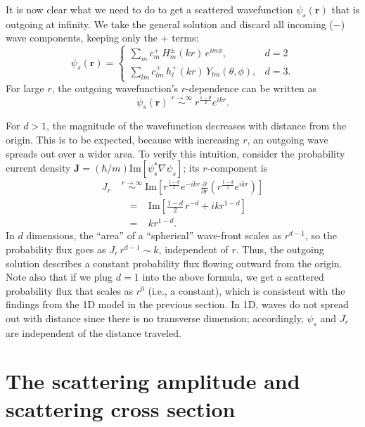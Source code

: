 \documentclass[pra,12pt]{revtex4}
\begin{document}
It is now clear what we need to do to get a scattered wavefunction
$\psi_s(\mathbf{r})$ that is outgoing at infinity.  We take the
general solution and discard all incoming ($-$) wave components,
keeping only the $+$ terms:
$$\psi_s(\mathbf{r}) = \begin{cases} \displaystyle\sum_{m} c_m^+\,H_m^\pm(kr)\,e^{im\phi}, &d=2\\ \displaystyle\sum_{lm} c_{lm}^+\,h_l^+(kr)\,Y_{lm}(\theta,\phi),&d=3.\end{cases}$$
For large $r$, the outgoing wavefunction's $r$-dependence can be
written as
$$\psi_s(\mathbf{r}) \; \overset{r\rightarrow\infty}{\sim} \; r^{\frac{1-d}{2}} e^{ikr}.$$

For $d > 1$, the magnitude of the wavefunction decreases with distance
from the origin.  This is to be expected, because with increasing $r$,
an outgoing wave spreads out over a wider area.  To verify this
intuition, consider the probability current density
$\mathbf{J} = (\hbar/m) \mathrm{Im}\left[\psi_s^*\nabla\psi_s\right]$;
its $r$-component is
$$\begin{aligned}J_r \; &\overset{r\rightarrow\infty}{\sim} \; \mathrm{Im}\left[r^{\frac{1-d}{2}} e^{-ikr} \frac{\partial}{\partial r}\left(r^{\frac{1-d}{2}} e^{ikr}\right)\right] \\ &\;\;=\;\;\;\mathrm{Im}\left[\frac{1-d}{2}\, r^{-d} + ik r^{1-d}\right]\\ &\;\;=\;\;\; kr^{1-d}.\end{aligned}$$
In $d$ dimensions, the ``area'' of a ``spherical'' wave-front scales
as $r^{d-1}$, so the probability flux goes as $J_r \,r^{d-1} \sim k$,
independent of $r$.  Thus, the outgoing solution describes a constant
probability flux flowing outward from the origin.  Note also that if
we plug $d=1$ into the above formula, we get a scattered probability
flux that scales as $r^0$ (i.e., a constant), which is consistent
with the findings from the 1D model in the previous section.
In 1D, waves do not spread out with distance since there is no
transverse dimension; accordingly, $\psi_s$ and $J_r$ are independent
of the distance traveled.

\section{The scattering amplitude and scattering cross section}
\end{document}
